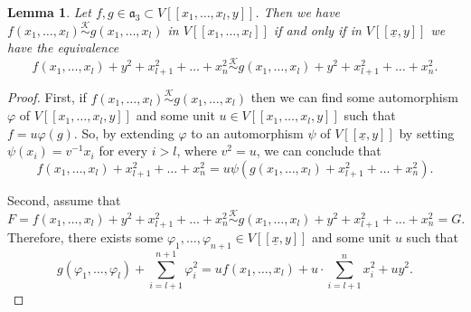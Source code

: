 \documentclass{article}
\newtheorem{lemma}[theorem]{Lemma}
\newcommand{\equivk}{\overset{\mathcal{K}}{\sim}}
\numberwithin{theorem}{section}
\begin{document}
\begin{lemma}\label{prop:rank_good_def}
    Let $f, g \in \mathfrak{a}_3 \subset V[[x_1, \dots, x_l,y]]$. Then we have  $f\left(x_1, \dots, x_l\right) \equivk  g\left(x_1, \dots, x_l\right)$ in $V[[x_1, \dots, x_l]]$ if and only if in $V[[\underline{x},y]]$ we have the equivalence $$f\left(x_1, \dots, x_l\right)+y^2+x_{l+1}^2 + \dots + x_n^2 \equivk  g\left(x_1, \dots, x_l\right)+y^2+x_{l+1}^2 + \dots + x_n^2.$$  
\end{lemma}

\begin{proof}
    First, if $f\left(x_1, \dots, x_l\right) \equivk g\left(x_1, \dots, x_l \right)$ then we can find some automorphism $\varphi$ of $V[[x_1, \dots, x_l, y]]$ and some unit $u \in V[[x_1, \dots, x_l, y]]$ such that $f = u \varphi(g)$. So, by extending $\varphi$ to an automorphism $\psi$ of $V[[\underline{x},y]]$ by setting $\psi \left(x_i\right)=v^{-1} x_i$ for every $i>l$, where $v^2=u$, we can conclude that 
    \begin{equation*}
        f\left(x_1, \dots, x_l\right) +x_{l+1}^2 + \dots + x_n^2  = u \psi\left(g\left(x_1, \dots, x_l\right) +x_{l+1}^2 + \dots + x_n^2\right). 
    \end{equation*}
    

    \noindent Second, assume that 
    \begin{equation*}
        F=f\left(x_1, \dots, x_l \right)+ y^2+ x_{l+1}^2 + \dots + x_n^2 \equivk g\left(x_1, \dots, x_l\right)+y^2 +x_{l+1}^2 + \dots + x_n^2=G.
    \end{equation*}
    Therefore, there exists some $\varphi_1, \dots, \varphi_{n+1} \in V[[\underline{x},y]]$ and some unit $u$ such that 
    \begin{equation*}
         g\left(\varphi_1, \dots, \varphi_{l}\right) + \sum_{i=l+1}^{n+1} \varphi_i^2 =   uf\left(x_1, \dots, x_l\right) + u\cdot \sum_{i=l+1}^n x_i^2 +uy^2.
    \end{equation*}
    

\end{proof}
\end{document}
